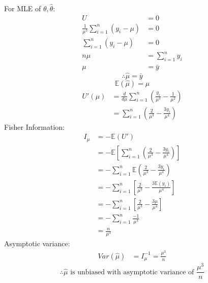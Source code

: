 \documentclass[a4paper]{article}
\begin{document}
			\newpage
			For MLE of \(\theta,\hat{\theta}\):
				\begin{equation*}
					\begin{split}
						U &= 0\\
						\frac{1}{\mu^3} \sum_{i=1}^n \left(y_i -\mu\right) &= 0\\
						\sum_{i=1}^n \left(y_i -\mu\right) &= 0\\
						n\mu &= \sum_{i=1}^n y_i\\
						\mu &= \bar{y}
					\end{split}
				\end{equation*}
			\[\therefore \hat{\mu} = \bar{y}\]
			\begin{equation*}
				\mathbb{E}(\hat{\mu}) = \mu
			\end{equation*}
			\begin{equation*}
				\begin{split}
					U'(\mu) &= \frac{d}{d\mu} \sum_{i=1}^n \left(\frac{y_i}{\mu^3} - \frac{1}{\mu^2}\right)\\
					&= \sum_{i=1}^n \left(\frac{2}{\mu^3} - \frac{3y_i}{\mu^4}\right)
				\end{split}
			\end{equation*}
			Fisher Information:
				\begin{equation*}
					\begin{split}
						I_\mu &= -\mathbb{E}(U')\\
						&= -\mathbb{E} \left[\sum_{i=1}^n \left(\frac{2}{\mu^3} - \frac{3y_i}{\mu^4}\right)\right]\\
						&= -\sum_{i=1}^n \mathbb{E} \left(\frac{2}{\mu^3} - \frac{3y_i}{\mu^4}\right)\\
						&= -\sum_{i=1}^n \left[\frac{2}{\mu^3} - \frac{3\mathbb{E}(y_i)}{\mu^4}\right]\\
						&= -\sum_{i=1}^n \left[\frac{2}{\mu^3} - \frac{3\mu}{\mu^4}\right]\\
						&= -\sum_{i=1}^n \frac{-1}{\mu^3}\\
						&= \frac{n}{\mu^3}
					\end{split}
				\end{equation*}
			Asymptotic variance:
				\begin{equation*}
					\begin{split}
						Var(\hat{\mu}) &=  I_\mu^{-1} = \frac{\mu^3}{n}
					\end{split}
				\end{equation*}
			\[\therefore \hat{\mu} \text{ is unbiased with asymptotic variance of } \frac{\mu^3}{n}\]
		
\end{document}
